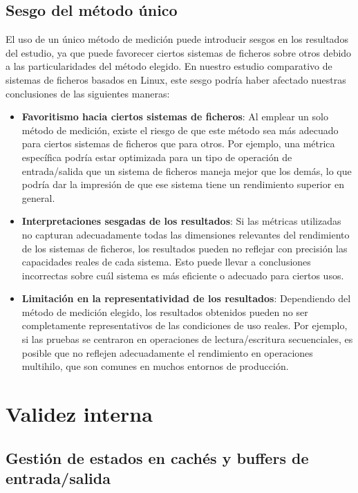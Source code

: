 \subsection{Sesgo del método único}

El uso de un único método de medición puede introducir sesgos en los resultados del estudio, ya que puede favorecer ciertos sistemas de ficheros sobre otros debido a las particularidades del método elegido. En nuestro estudio comparativo de sistemas de ficheros basados en Linux, este sesgo podría haber afectado nuestras conclusiones de las siguientes maneras:

\begin{itemize}
    \item \textbf{Favoritismo hacia ciertos sistemas de ficheros}: Al emplear un solo método de medición, existe el riesgo de que este método sea más adecuado para ciertos sistemas de ficheros que para otros. Por ejemplo, una métrica específica podría estar optimizada para un tipo de operación de entrada/salida que un sistema de ficheros maneja mejor que los demás, lo que podría dar la impresión de que ese sistema tiene un rendimiento superior en general.
    \item \textbf{Interpretaciones sesgadas de los resultados}: Si las métricas utilizadas no capturan adecuadamente todas las dimensiones relevantes del rendimiento de los sistemas de ficheros, los resultados pueden no reflejar con precisión las capacidades reales de cada sistema. Esto puede llevar a conclusiones incorrectas sobre cuál sistema es más eficiente o adecuado para ciertos usos.
    \item \textbf{Limitación en la representatividad de los resultados}: Dependiendo del método de medición elegido, los resultados obtenidos pueden no ser completamente representativos de las condiciones de uso reales. Por ejemplo, si las pruebas se centraron en operaciones de lectura/escritura secuenciales, es posible que no reflejen adecuadamente el rendimiento en operaciones multihilo, que son comunes en muchos entornos de producción.
\end{itemize}

\section{Validez interna}

\subsection{Gestión de estados en cachés y buffers de entrada/salida}

